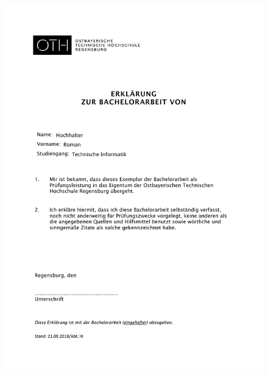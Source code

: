 \documentclass[10pt,a4paper,abstraction]{scrreprt}
\begin{document}
	\begin{figure}[H]
		\includegraphics[width=\linewidth]{Bachelorerklaerung}
	\end{figure}


	\vspace*{4cm}
\end{document}
